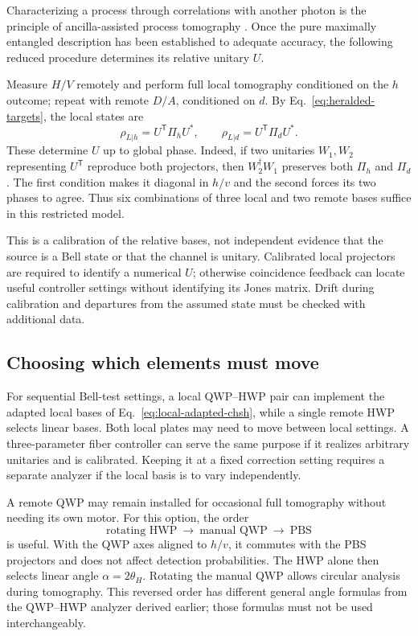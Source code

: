 \documentclass[a4paper,10pt]{article}
\begin{document}
Characterizing a process through correlations with another photon is
the principle of ancilla-assisted process tomography
\cite{Altepeter2003Ancilla}. Once the pure maximally entangled description
has been established to adequate accuracy, the following reduced
procedure determines its relative unitary $U$.

Measure $H/V$ remotely and perform full local tomography conditioned on
the $h$ outcome; repeat with remote $D/A$, conditioned on $d$. By
Eq.~\eqref{eq:heralded-targets}, the local states are
\begin{equation}
    \rho_{L|h}=U^{\mathsf T}\Pi_hU^*,
    \qquad
    \rho_{L|d}=U^{\mathsf T}\Pi_dU^*.
    \label{eq:two-remote-conditions}
\end{equation}
These determine $U$ up to global phase. Indeed, if two unitaries $W_1,W_2$
representing $U^{\mathsf T}$ reproduce both projectors, then
$W_2^\dagger W_1$ preserves both $\Pi_h$ and $\Pi_d$. The first condition
makes it diagonal in $h/v$ and the second forces its two phases to agree.
Thus six combinations of three local and two remote bases suffice in
this restricted model.

This is a calibration of the relative bases, not independent evidence
that the source is a Bell state or that the channel is unitary.
Calibrated local projectors are required to identify a numerical $U$;
otherwise coincidence feedback can locate useful controller settings
without identifying its Jones matrix. Drift during calibration and
departures from the assumed state must be checked with additional data.

\subsection{Choosing which elements must move}

For sequential Bell-test settings, a local QWP--HWP pair can implement
the adapted local bases of Eq.~\eqref{eq:local-adapted-chsh}, while a
single remote HWP selects linear bases. Both local plates may need to
move between local settings. A three-parameter fiber controller can
serve the same purpose if it realizes arbitrary unitaries and is
calibrated. Keeping it at a fixed correction setting requires a separate
analyzer if the local basis is to vary independently.

A remote QWP may remain installed for occasional full tomography
without needing its own motor. For this option, the order
\begin{equation}
    \text{rotating HWP}\ \longrightarrow\
    \text{manual QWP}\ \longrightarrow\ \text{PBS}
\end{equation}
is useful. With the QWP axes aligned to $h/v$, it commutes with the PBS
projectors and does not affect detection probabilities. The HWP alone
then selects linear angle $\alpha=2\theta_H$. Rotating the manual QWP
allows circular analysis during tomography. This reversed order has
different general angle formulas from the QWP--HWP analyzer derived
earlier; those formulas must not be used interchangeably.
\end{document}
